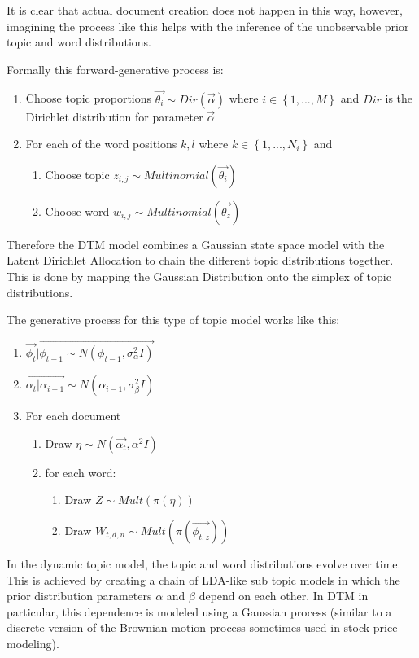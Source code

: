 \documentclass[12pt,journal,letterpaper,oneside,onecolumn]{IEEEtran}
\begin{document}
It is clear that actual document creation does not happen in this way, however, imagining the process like this helps with the inference of the unobservable prior topic and word distributions. 

Formally this forward-generative process is:
\begin{enumerate}
	\item Choose topic proportions $\vec{\theta_i} \sim Dir ( \vec{\alpha} ) $ where $i \in \left\{1,...,M \right\} $ and $Dir$ is the Dirichlet distribution for parameter $\vec{\alpha}$ \\

	\item For each of the word positions $k,l$ where $k \in \left\{ 1,...,N_i \right\} $ and 
	\begin{enumerate}
		\item Choose topic $z_{i,j} \sim Multinomial(\vec{\theta_i})$
		\item Choose word $w_{i,j} \sim Multinomial(\vec{\theta_z})$
	\end{enumerate}
\end{enumerate}


Therefore the DTM model combines a Gaussian state space model with the Latent Dirichlet Allocation to chain the different topic distributions together.
This is done by mapping the Gaussian Distribution onto the simplex of topic distributions.

The generative process for this type of topic model works like this:
\begin{enumerate}
	\item $\vec{\phi_t} | \vec{\phi_{t-1} \sim N(\phi_{t-1}, \sigma_{\alpha}^2 I)}$
	\item $\vec{\alpha_t | \alpha_{i-1}} \sim N(\alpha_{i-1}, \sigma_{\beta}^2 I)$
	\item For each document
	\begin{enumerate}
		\item Draw $\eta \sim N(\vec{\alpha_t} , \alpha^2 I)$
		\item for each word:
		\begin{enumerate}
			\item Draw $Z \sim Mult(\pi(\eta))$
			\item Draw $W_{t,d,n} \sim Mult(\pi(\vec{\phi_{t,z}}))$
		\end{enumerate}
	\end{enumerate}
\end{enumerate}


In the dynamic topic model, the topic and word distributions evolve over time. This is achieved by creating a chain of LDA-like sub topic models in which the prior distribution parameters $\alpha$ and $\beta$ depend on each other. 
In DTM in particular, this dependence is modeled using a Gaussian process (similar to a discrete version of the Brownian motion process sometimes used in stock price modeling).
\end{document}
